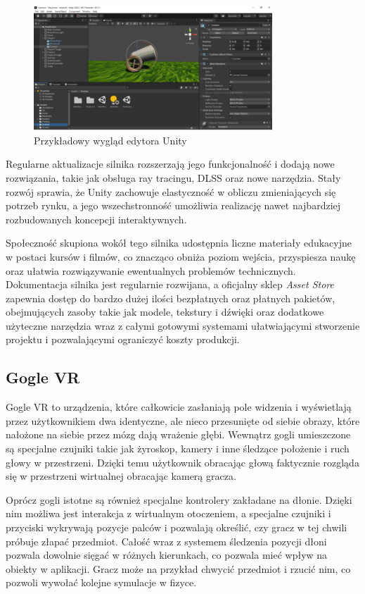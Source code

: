 \begin{figure}[!htb]
    \centering
    \includegraphics[width=0.8\textwidth]{images/unity.png}
    \caption{Przykładowy wygląd edytora Unity}
    \label{unity_engine_example}
\end{figure}

Regularne aktualizacje silnika rozszerzają jego funkcjonalność i dodają nowe rozwiązania, takie jak obsługa ray tracingu, DLSS oraz nowe narzędzia. Stały rozwój sprawia, że Unity zachowuje elastyczność w obliczu zmieniających się potrzeb rynku, a jego wszechstronność umożliwia realizację nawet najbardziej rozbudowanych koncepcji interaktywnych.

Społeczność skupiona wokół tego silnika udostępnia liczne materiały edukacyjne w postaci kursów i filmów, co znacząco obniża poziom wejścia, przyspiesza naukę oraz ułatwia rozwiązywanie ewentualnych problemów technicznych. Dokumentacja silnika jest regularnie rozwijana, a oficjalny sklep \textit{Asset Store} zapewnia dostęp do bardzo dużej ilości bezpłatnych oraz płatnych pakietów, obejmujących zasoby takie jak modele, tekstury i dźwięki oraz dodatkowe użyteczne narzędzia wraz z całymi gotowymi systemami ułatwiającymi stworzenie projektu i pozwalającymi ograniczyć koszty produkcji.


\subsection{Gogle VR}
Gogle VR to urządzenia, które całkowicie zasłaniają pole widzenia i wyświetlają przez użytkownikiem dwa identyczne, ale nieco przesunięte od siebie obrazy, które nałożone na siebie przez mózg dają wrażenie głębi. Wewnątrz gogli umieszczone są specjalne czujniki takie jak żyroskop, kamery i inne śledzące położenie i ruch głowy w przestrzeni. Dzięki temu użytkownik obracając głową faktycznie rozgląda się w przestrzeni wirtualnej obracając kamerą gracza.

Oprócz gogli istotne są również specjalne kontrolery zakładane na dłonie. Dzięki nim możliwa jest interakcja z wirtualnym otoczeniem, a specjalne czujniki i przyciski wykrywają pozycje palców i pozwalają określić, czy gracz w tej chwili próbuje złapać przedmiot. Całość wraz z systemem śledzenia pozycji dłoni pozwala dowolnie sięgać w różnych kierunkach, co pozwala mieć wpływ na obiekty w aplikacji. Gracz może na przykład chwycić przedmiot i rzucić nim, co pozwoli wywołać kolejne symulacje w fizyce.


